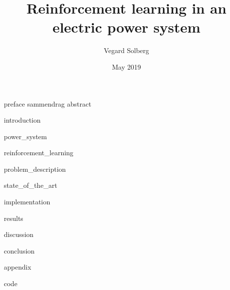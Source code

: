 \documentclass{book}
\title{Reinforcement learning in an electric power system}
\author{Vegard Solberg}
\date{May 2019}
\begin{document}
    \frontmatter
    {preface}
    {sammendrag}
    {abstract}
    
    \tableofcontents
    
    \mainmatter
    {introduction}
    
    {power_system}
 
    {reinforcement_learning}
    
    {problem_description}
    
    {state_of_the_art}
    
    {implementation}
    
    
    {results}
    
    {discussion}

    {conclusion}

    \printbibliography

    \appendix
    {appendix}
    
    {code}
    
\end{document}
